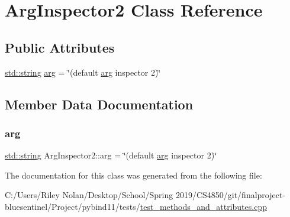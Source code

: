 \hypertarget{class_arg_inspector2}{}\section{Arg\+Inspector2 Class Reference}
\label{class_arg_inspector2}
\subsection*{Public Attributes}
\begin{DoxyCompactItemize}
\item 
\mbox{\hyperlink{_s_d_l__opengl__glext_8h_ab4ccfaa8ab0e1afaae94dc96ef52dde1}{std\+::string}} \mbox{\hyperlink{class_arg_inspector2_a454fbfa2e3a2cbf2f8f95a32654504c0}{arg}} = \char`\"{}(default \mbox{\hyperlink{structarg}{arg}} inspector 2)\char`\"{}
\end{DoxyCompactItemize}


\subsection{Member Data Documentation}
\mbox{\label{class_arg_inspector2_a454fbfa2e3a2cbf2f8f95a32654504c0}} 
\subsubsection{\texorpdfstring{arg}{arg}}
{\footnotesize\ttfamily \mbox{\hyperlink{_s_d_l__opengl__glext_8h_ab4ccfaa8ab0e1afaae94dc96ef52dde1}{std\+::string}} Arg\+Inspector2\+::arg = \char`\"{}(default \mbox{\hyperlink{structarg}{arg}} inspector 2)\char`\"{}}



The documentation for this class was generated from the following file\+:\begin{DoxyCompactItemize}
\item 
C\+:/\+Users/\+Riley Nolan/\+Desktop/\+School/\+Spring 2019/\+C\+S4850/git/finalproject-\/bluesentinel/\+Project/pybind11/tests/\mbox{\hyperlink{test__methods__and__attributes_8cpp}{test\+\_\+methods\+\_\+and\+\_\+attributes.\+cpp}}\end{DoxyCompactItemize}
